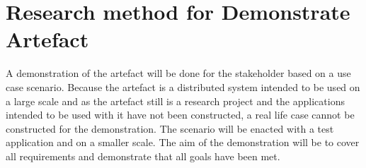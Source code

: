 \section{Research method for Demonstrate Artefact}
A demonstration of the artefact will be done for the stakeholder based on a use case scenario. Because the artefact is a distributed system intended to be used on a large scale and as the artefact still is a research project and the applications intended to be used with it have not been constructed, a real life case cannot be constructed for the demonstration. The scenario will be enacted with a test application and on a smaller scale. The aim of the demonstration will be to cover all requirements and demonstrate that all goals have been met. 
